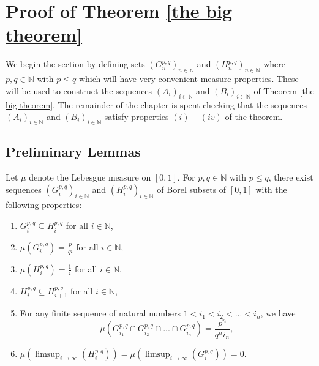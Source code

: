 \documentclass[12pt]{article}
\begin{document}
\section{Proof of Theorem \ref{the big theorem}} \label{the k intersection case}


    We begin the section by defining sets $(G^{p,q}_n)_{n \in \mathbb{N}}$ and $(H^{p,q}_n)_{n \in \mathbb{N}}$ where $p,q \in \mathbb{N}$ with $p \leq q$ which will have very convenient measure properties. These will be used to construct the sequences $(A_i)_{i \in \mathbb{N}}$ and $(B_i)_{i \in \mathbb{N}}$ of Theorem \ref{the big theorem}. The remainder of the chapter is spent checking that the sequences $(A_i)_{i \in \mathbb{N}}$ and $(B_i)_{i \in \mathbb{N}}$ satisfy properties $(i)-(iv)$ of the theorem.


\subsection{Preliminary Lemmas}

    
\begin{lemma}\label{construction of Gpq sets}
    Let $\mu$ denote the Lebesgue measure on $[0,1]$. For $p,q \in \mathbb{N}$ with $p \leq q$, there exist sequences $(G^{p,q}_i)_{i \in \mathbb{N}}$ and $(H^{p,q}_i)_{i \in \mathbb{N}}$ of Borel subsets of $[0,1]$ with the following properties:
\begin{enumerate}[label=(\roman*)]
    \item $G_i^{p,q} \subseteq H_i^{p,q}$ for all $i \in \mathbb{N}$,
    \item $ \mu\left(G_i^{p,q}\right) = \frac{p}{qi} $ for all $i \in \mathbb{N}$, 
    \item$ \mu(H_i^{p,q}) = \frac{1}{i} $ for all $i \in \mathbb{N}$, 
    \item  $ H_{i}^{p,q}\subseteq H_{i+1}^{p,q}$ for all $i \in \mathbb{N}$, 
     \item For any finite sequence of natural numbers $1<i_1<i_2<...<i_n$, we have 
     \[\mu\left(G_{i_1}^{p,q} \cap G_{i_2}^{p,q} \cap ... \cap G_{i_n}^{p,q}\right) = \frac{p^n}{q^n i_n},\]
     \item $\mu\left(\limsup_{i \rightarrow \infty}(H^{p,q}_i)\right)=\mu\left(\limsup_{i \rightarrow \infty}(G^{p,q}_i)\right)=0$.
    \end{enumerate}

\end{lemma}
\end{document}
